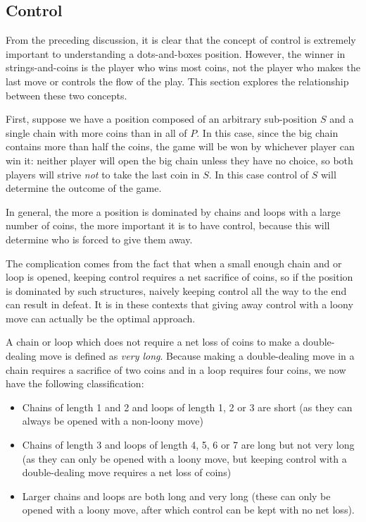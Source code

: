 \documentclass[a4paper,twocolumn]{article}
\begin{document}
\subsection{Control}
\label{smallchains}

From the preceding discussion, it is clear that the concept of control
is extremely important to understanding a dots-and-boxes
position. However, the winner in strings-and-coins is the player who
wins most coins, not the player who makes the last move or controls
the flow of the play. This section explores the relationship between
these two concepts.

First, suppose we have a position composed of an arbitrary
sub-position $S$ and a single chain with more coins than in all of
$P$. In this case, since the big chain contains more than half the
coins, the game will be won by whichever player can win it: neither
player will open the big chain unless they have no choice, so both
players will strive \emph{not} to take the last coin in $S$. In this
case control of $S$ will determine the outcome of the game.

In general, the more a position is dominated by chains and loops with
a large number of coins, the more important it is to have control,
because this will determine who is forced to give them away.

The complication comes from the fact that when a small enough chain
and or loop is opened, keeping control requires a net sacrifice of
coins, so if the position is dominated by such structures, naively
keeping control all the way to the end can result in defeat. It is in
these contexts that giving away control with a loony move can actually
be the optimal approach.

A chain or loop which does not require a net loss of coins to make a
double-dealing move is defined as \emph{very long}. Because making a
double-dealing move in a chain requires a sacrifice of two coins and
in a loop requires four coins, we now have the following
classification:

\begin{itemize}
  \item Chains of length 1 and 2 and loops of length 1, 2 or 3 are
    short (as they can always be opened with a non-loony move)
  \item Chains of length 3 and loops of length 4, 5, 6 or 7 are long
    but not very long (as they can only be opened with a loony move,
    but keeping control with a double-dealing move requires a net loss
    of coins)
  \item Larger chains and loops are both long and very long (these can
    only be opened with a loony move, after which control can be kept
    with no net loss).
\end{itemize}
\end{document}
